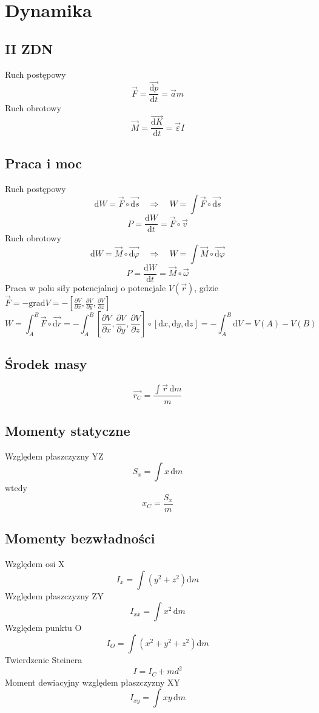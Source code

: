 \documentclass[12pt,a4paper]{article}
\begin{document}
\section*{Dynamika}
\subsection*{II ZDN}
Ruch postępowy
\[\vec{F}=\frac{\vec{\mathrm{d}p}}{\mathrm{d}t}=\vec{a}m\]
Ruch obrotowy
\[\vec{M}=\frac{\vec{\mathrm{d}K}}{\mathrm{d}t}=\vec{\varepsilon}I\]

\subsection*{Praca i moc}
Ruch postępowy
\[\mathrm{d}W=\vec{F}\circ \vec{\mathrm{d}s} \quad \Rightarrow \quad W=\int \vec{F}\circ \vec{\mathrm{d}s} \]
\[P = \frac{\mathrm{d}W}{\mathrm{d}t} = \vec{F}\circ \vec{v}\]
Ruch obrotowy
\[\mathrm{d}W=\vec{M}\circ \vec{\mathrm{d}\varphi} \quad \Rightarrow \quad W=\int \vec{M}\circ \vec{\mathrm{d}\varphi} \]
\[P = \frac{\mathrm{d}W}{\mathrm{d}t} = \vec{M}\circ \vec{\omega}\]
Praca w polu siły potencjalnej o potencjale \(V(\vec{r})\), gdzie \(\vec{F}=-\mathrm{grad}V=-\left[ \frac{\partial V}{\partial x},\frac{\partial V}{\partial y},\frac{\partial V}{\partial z} \right] \)
\[W = \int_{A}^{B} \vec{F}\circ \vec{\mathrm{d}r}  = -\int_{A}^{B}  \left[ \frac{\partial V}{\partial x},\frac{\partial V}{\partial y},\frac{\partial V}{\partial z} \right] \circ \left[ \mathrm{d}x,\mathrm{d}y,\mathrm{d}z \right]  = -\int_{A}^{B} \mathrm{d}V = V(A)-V(B) \]

\subsection*{Środek masy}
\[\vec{r_C}=\frac{\int \vec{r}\,\mathrm{d}m}{m}\]

\subsection*{Momenty statyczne}
Względem płaszczyzny YZ
\[S_x = \int x\, \mathrm{d}m\]
wtedy
\[x_C = \frac{S_x}{m}\]

\subsection*{Momenty bezwładności}
Względem osi X
\[I_x=\int\left(y^2+z^2\right)\mathrm{d}m\]
Względem płaszczyzny ZY
\[I_{xx}=\int x^2 \,\mathrm{d}m\]
Względem punktu O
\[I_O=\int\left(x^2+y^2+z^2\right)\mathrm{d}m\]
Twierdzenie Steinera
\[I=I_C+md^2\]
Moment dewiacyjny względem płaszczyzny XY
\[I_{xy}=\int xy \,\mathrm{d}m\]
\end{document}
